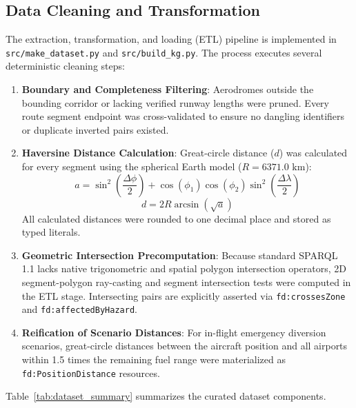 \documentclass[conference]{IEEEtran}
\begin{document}
\subsection{Data Cleaning and Transformation}
The extraction, transformation, and loading (ETL) pipeline is implemented in \texttt{src/make\_dataset.py} and \texttt{src/build\_kg.py}. The process executes several deterministic cleaning steps:
\begin{enumerate}
    \item \textbf{Boundary and Completeness Filtering}: Aerodromes outside the bounding corridor or lacking verified runway lengths were pruned. Every route segment endpoint was cross-validated to ensure no dangling identifiers or duplicate inverted pairs existed.
    \item \textbf{Haversine Distance Calculation}: Great-circle distance ($d$) was calculated for every segment using the spherical Earth model ($R = 6371.0\text{ km}$):
    \begin{equation}
        a = \sin^2\left(\frac{\Delta\phi}{2}\right) + \cos(\phi_1)\cos(\phi_2)\sin^2\left(\frac{\Delta\lambda}{2}\right)
    \end{equation}
    \begin{equation}
        d = 2R \arcsin\left(\sqrt{a}\right)
    \end{equation}
    All calculated distances were rounded to one decimal place and stored as typed literals.
    \item \textbf{Geometric Intersection Precomputation}: Because standard SPARQL 1.1 lacks native trigonometric and spatial polygon intersection operators, 2D segment-polygon ray-casting and segment intersection tests were computed in the ETL stage. Intersecting pairs are explicitly asserted via \texttt{fd:crossesZone} and \texttt{fd:affectedByHazard}.
    \item \textbf{Reification of Scenario Distances}: For in-flight emergency diversion scenarios, great-circle distances between the aircraft position and all airports within 1.5 times the remaining fuel range were materialized as \texttt{fd:PositionDistance} resources.
\end{enumerate}

Table~\ref{tab:dataset_summary} summarizes the curated dataset components.
\end{document}
